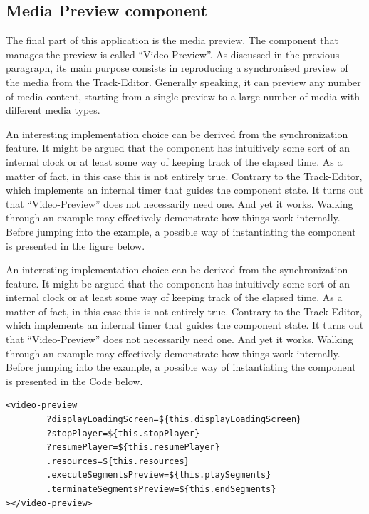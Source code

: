 \subsection{Media Preview component}
\label{subsec:mediaPreview}

The final part of this application is the media preview. The component that manages the preview is called “Video-Preview”. As discussed in the previous paragraph, its main purpose consists in reproducing a synchronised preview of the media from the Track-Editor. Generally speaking, it can preview any number of media content, starting from a single preview to a large number of media with different media types.

An interesting implementation choice can be derived from the synchronization feature. It might be argued that the component has intuitively some sort of an internal clock or at least some way of keeping track of the elapsed time. As a matter of fact, in this case this is not entirely true. Contrary to the Track-Editor, which implements an internal timer that guides the component state. It turns out that “Video-Preview” does not necessarily need one. And yet it works. Walking through an example may effectively demonstrate how things work internally. Before jumping into the example, a possible way of instantiating the component is presented in the figure below.

An interesting implementation choice can be derived from the synchronization feature. It might be argued that the component has intuitively some sort of an internal clock or at least some way of keeping track of the elapsed time. As a matter of fact, in this case this is not entirely true. Contrary to the Track-Editor, which implements an internal timer that guides the component state. It turns out that “Video-Preview” does not necessarily need one. And yet it works. Walking through an example may effectively demonstrate how things work internally. Before jumping into the example, a possible way of instantiating the component is presented in the Code below.
\\
\begin{lstlisting}[caption={Video-Preview component instantiation},label={videoPreview}, language=HTML5]
<video-preview
        ?displayLoadingScreen=${this.displayLoadingScreen} 
        ?stopPlayer=${this.stopPlayer}
        ?resumePlayer=${this.resumePlayer}
        .resources=${this.resources}
        .executeSegmentsPreview=${this.playSegments} 
        .terminateSegmentsPreview=${this.endSegments}
></video-preview>
\end{lstlisting}

